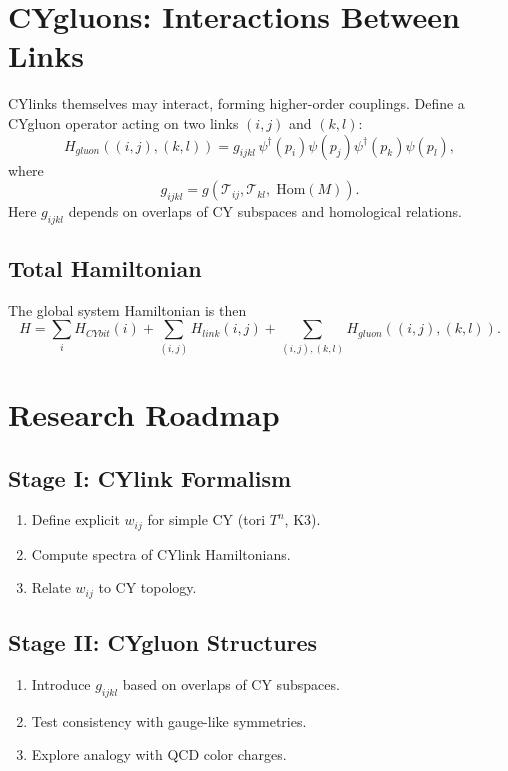 \documentclass[12pt,a4paper]{article}
\begin{document}
\section{CYgluons: Interactions Between Links}
CYlinks themselves may interact, forming higher-order couplings.  
Define a CYgluon operator acting on two links $(i,j)$ and $(k,l)$:
\begin{equation}
H_{gluon}((i,j),(k,l)) = g_{ijkl} \, \psi^\dagger(p_i)\psi(p_j)\psi^\dagger(p_k)\psi(p_l),
\end{equation}
where
\begin{equation}
g_{ijkl} = g(\mathcal{T}_{ij}, \mathcal{T}_{kl}, \; \mathrm{Hom}(M)).
\end{equation}
Here $g_{ijkl}$ depends on overlaps of CY subspaces and homological relations.  

\subsection{Total Hamiltonian}
The global system Hamiltonian is then
\begin{equation}
H = \sum_i H_{CYbit}(i) + \sum_{(i,j)} H_{link}(i,j) + \sum_{(i,j),(k,l)} H_{gluon}((i,j),(k,l)).
\end{equation}

\section{Research Roadmap}
\subsection{Stage I: CYlink Formalism}
\begin{enumerate}
\item Define explicit $w_{ij}$ for simple CY (tori $T^n$, K3).  
\item Compute spectra of CYlink Hamiltonians.  
\item Relate $w_{ij}$ to CY topology.  
\end{enumerate}

\subsection{Stage II: CYgluon Structures}
\begin{enumerate}
\item Introduce $g_{ijkl}$ based on overlaps of CY subspaces.  
\item Test consistency with gauge-like symmetries.  
\item Explore analogy with QCD color charges.  
\end{enumerate}
\end{document}
